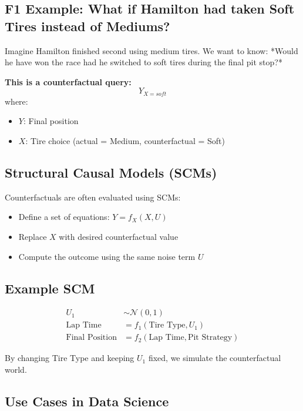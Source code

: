 \documentclass[12pt]{book}
\begin{document}
\subsection*{F1 Example: What if Hamilton had taken Soft Tires instead of Mediums?}

Imagine Hamilton finished second using medium tires. We want to know: *Would he have won the race had he switched to soft tires during the final pit stop?*

\textbf{This is a counterfactual query:}
\[
Y_{X=soft}
\]
where:
\begin{itemize}
    \item \( Y \): Final position
    \item \( X \): Tire choice (actual = Medium, counterfactual = Soft)
\end{itemize}

\subsection*{Structural Causal Models (SCMs)}

Counterfactuals are often evaluated using SCMs:

\begin{itemize}
    \item Define a set of equations: \( Y = f_X(X, U) \)
    \item Replace \( X \) with desired counterfactual value
    \item Compute the outcome using the same noise term \( U \)
\end{itemize}

\subsection*{Example SCM}

\begin{align*}
    U_1 &\sim \mathcal{N}(0, 1) \\
    \text{Lap Time} &= f_1(\text{Tire Type}, U_1) \\
    \text{Final Position} &= f_2(\text{Lap Time}, \text{Pit Strategy})
\end{align*}

By changing Tire Type and keeping \( U_1 \) fixed, we simulate the counterfactual world.

\subsection*{Use Cases in Data Science}
\end{document}
